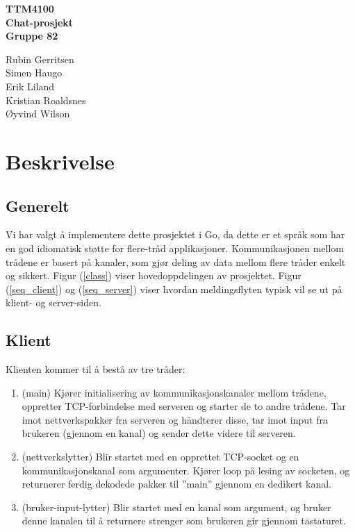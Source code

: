 \documentclass[12pt,a4paper,norsk]{article}
\begin{document}
\begin{titlepage}
    \centering
    \vfill
    {\bf\Large
        TTM4100 \\
        Chat-prosjekt \\
        \vskip2cm
        Gruppe 82
    }

   {\large
   Rubin Gerritsen\\
   Simen Haugo\\
   Erik Liland\\
   Kristian Roaldsnes\\
   Øyvind Wilson
   }
   \vfill
   \vfill
   \tableofcontents
   \vfill
\end{titlepage}

\section{Beskrivelse}
\subsection{Generelt}
Vi har valgt å implementere dette prosjektet i Go, da dette er et språk som har en god idiomatisk støtte for flere-tråd applikasjoner. Kommunikasjonen mellom trådene er basert på kanaler, som gjør deling av data mellom flere tråder enkelt og sikkert. Figur (\ref{class}) viser hovedoppdelingen av prosjektet. Figur (\ref{seq_client}) og (\ref{seq_server}) viser hvordan meldingsflyten typisk vil se ut på klient- og server-siden.

\subsection{Klient}
Klienten kommer til å bestå av tre tråder:
\begin{enumerate}
	\item (main) Kjører initialisering av kommunikasjonskanaler mellom trådene, oppretter TCP-forbindelse med serveren og starter de to andre trådene. Tar imot nettverkspakker fra serveren og håndterer disse, tar imot input fra brukeren (gjennom en kanal) og sender dette videre til serveren.
	\item (nettverkslytter) Blir startet med en opprettet TCP-socket og en kommunikasjonskanal som argumenter. Kjører loop på lesing av socketen, og returnerer ferdig dekodede pakker til ”main” gjennom en dedikert kanal.
	\item (bruker-input-lytter) Blir startet med en kanal som argument, og bruker denne kanalen til å returnere strenger som brukeren gir gjennom tastaturet.
\end{enumerate}
\end{document}
